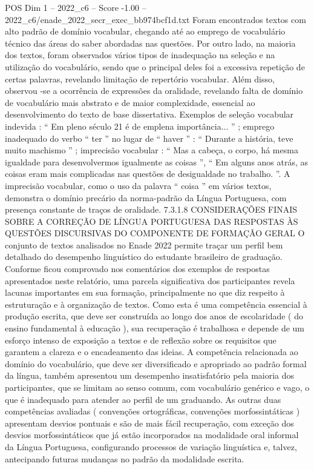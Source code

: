 \begin{textsample}{POS Dim 1 – 2022\_c6 – Score -1.00 – 2022\_c6/enade\_2022\_secr\_exec\_bb974bcf1d.txt}
Foram encontrados textos com alto padrão de domínio vocabular, chegando até ao emprego de vocabulário técnico das áreas do saber abordadas nas questões.
Por outro lado, na maioria dos textos, foram observados vários tipos de inadequação na seleção e na utilização do vocabulário, sendo que o principal deles foi a excessiva repetição de certas palavras, revelando limitação de repertório vocabular.
Além disso, observou -se a ocorrência de expressões da oralidade, revelando falta de domínio de vocabulário mais abstrato e de maior complexidade, essencial ao desenvolvimento do texto de base dissertativa.
Exemplos de seleção vocabular indevida : “ Em pleno século 21 é de emplena importância... ” ; emprego inadequado do verbo “ ter ” no lugar de “ haver ” : “ Durante a história, teve muito machismo ” ; imprecisão vocabular : “ Mas a cabeça, o corpo, há mesma igualdade para desenvolvermos igualmente as coisas ”, “ Em alguns anos atrás, as coisas eram mais complicadas nas questões de desigualdade no trabalho. ”.
A imprecisão vocabular, como o uso da palavra “ coisa ” em vários textos, demonstra o domínio precário da norma-padrão da Língua Portuguesa, com presença constante de traços de oralidade. 7.3.1.8 CONSIDERAÇÕES FINAIS SOBRE A CORREÇÃO DE LÍNGUA PORTUGUESA DAS RESPOSTAS ÀS QUESTÕES DISCURSIVAS DO COMPONENTE DE FORMAÇÃO GERAL O conjunto de textos analisados no Enade 2022 permite traçar um perfil bem detalhado do desempenho linguístico do estudante brasileiro de graduação.
Conforme ficou comprovado nos comentários dos exemplos de respostas apresentados neste relatório, uma parcela significativa dos participantes revela lacunas importantes em sua formação, principalmente no que diz respeito à estruturação e à organização de textos.
Como esta é uma competência essencial à produção escrita, que deve ser construída ao longo dos anos de escolaridade ( do ensino fundamental à educação ), sua recuperação é trabalhosa e depende de um esforço intenso de exposição a textos e de reflexão sobre os requisitos que garantem a clareza e o encadeamento das ideias.
A competência relacionada ao domínio do vocabulário, que deve ser diversificado e apropriado ao padrão formal da língua, também apresentou um desempenho insatisfatório pela maioria dos participantes, que se limitam ao senso comum, com vocabulário genérico e vago, o que é inadequado para atender ao perfil de um graduando.
As outras duas competências avaliadas ( convenções ortográficas, convenções morfossintáticas ) apresentam desvios pontuais e são de mais fácil recuperação, com exceção dos desvios morfossintáticos que já estão incorporados na modalidade oral informal da Língua Portuguesa, configurando processos de variação linguística e, talvez, antecipando futuras mudanças no padrão da modalidade escrita.

\end{textsample}
